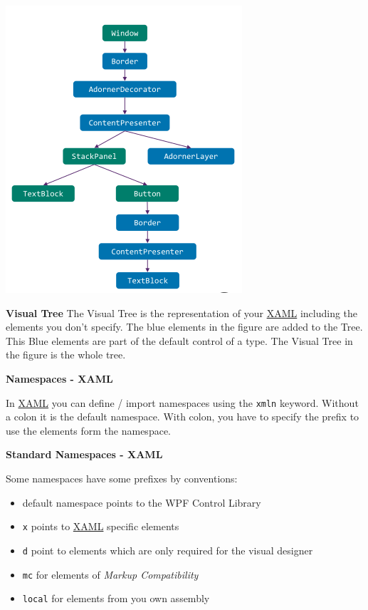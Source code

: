 \documentclass[10pt,twoside,landscape]{article}
\begin{document}
\begin{multicols}{4}
\begin{center}
\includegraphics[width=.9\linewidth]{img/visual_logical_tree.png}
\end{center}

\textbf{Visual Tree}
The Visual Tree is the representation of your \href{../../../roam/20211123162058-xaml.org}{XAML} including the elements you don't specify.
The blue elements in the figure are added to the Tree.
This Blue elements are part of the default control of a type.
The Visual Tree in the figure is the whole tree.

\textbf{Namespaces - XAML}

In \href{../../../roam/20211123162058-xaml.org}{XAML} you can define / import namespaces using the \texttt{xmln} keyword.
Without a colon it is the default namespace.
With colon, you have to specify the prefix to use the elements form the namespace. 

\textbf{Standard Namespaces - XAML}

Some namespaces have some prefixes by conventions:
\begin{itemize}
\item default namespace points to the WPF Control Library
\item \texttt{x} points to \href{../../../roam/20211123162058-xaml.org}{XAML} specific elements
\item \texttt{d} point to elements which are only required for the visual designer
\item \texttt{mc} for elements of \emph{Markup Compatibility}
\item \texttt{local} for elements from you own assembly
\end{itemize}


\end{multicols}
\end{document}
